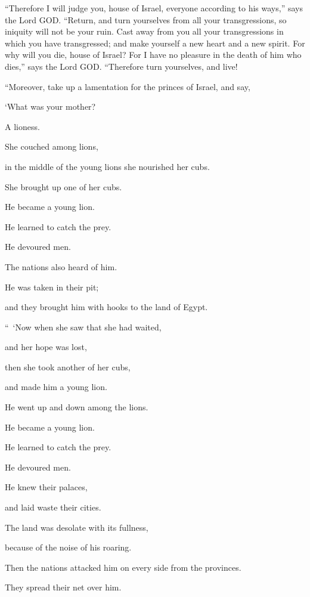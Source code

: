 \myverse{}“Therefore I will judge you, house of Israel, everyone according
to his ways,” says the Lord GOD. “Return, and turn yourselves from all your transgressions, so iniquity
will not be your ruin.
\myverse{}Cast away from you all your transgressions in which you have transgressed;
and make yourself a new heart and a new spirit. For why will you die, house of Israel?
\myverse{}For I have no pleasure in the death of him who dies,” says the Lord GOD.
“Therefore turn yourselves, and live!


\mychapter{} \myverse*{}“Moreover, take up a lamentation for the princes of Israel,
\myverse{}and say,

\quad\quad ‘What was your mother?

A lioness.

She couched among lions,

in the middle of the young lions she nourished her cubs.

\myverse{}She brought up one of her cubs.

He became a young lion.

He learned to catch the prey.

He devoured men.

\myverse{}The nations also heard of him.

He was taken in their pit;

and they brought him with hooks to the land of Egypt.


\vspace{\baselineskip} \myverse{}“ ‘Now when she saw that she had waited,

and her hope was lost,

then she took another of her cubs,

and made him a young lion.

\myverse{}He went up and down among the lions.

He became a young lion.

He learned to catch the prey.

He devoured men.

\myverse{}He knew their palaces,

and laid waste their cities.

The land was desolate with its fullness,

because of the noise of his roaring.

\myverse{}Then the nations attacked him on every side from the provinces.

They spread their net over him.

